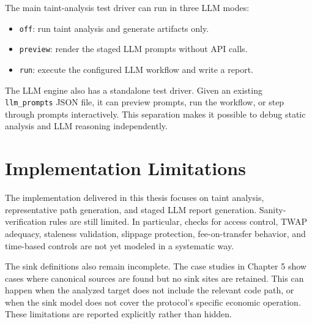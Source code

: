 The main taint-analysis test driver can run in three LLM modes:

\begin{itemize}
  \item \texttt{off}: run taint analysis and generate artifacts only.
  \item \texttt{preview}: render the staged LLM prompts without API calls.
  \item \texttt{run}: execute the configured LLM workflow and write a report.
\end{itemize}

The LLM engine also has a standalone test driver. Given an existing
\texttt{llm\_prompts} JSON file, it can preview prompts, run the workflow, or
step through prompts interactively. This separation makes it possible to debug
static analysis and LLM reasoning independently.

\section{Implementation Limitations}

The implementation delivered in this thesis focuses on
taint analysis, representative path generation, and staged LLM report
generation. Sanity-verification rules are still limited. In particular, checks
for access control, TWAP adequacy, staleness validation, slippage protection,
fee-on-transfer behavior, and time-based controls are not yet modeled in a
systematic way.

The sink definitions also remain incomplete. The case studies in Chapter 5 show
cases where canonical sources are found but no sink sites are retained. This
can happen when the analyzed target does not include the relevant code path, or
when the sink model does not cover the protocol's specific economic operation.
These limitations are reported explicitly rather than hidden.

